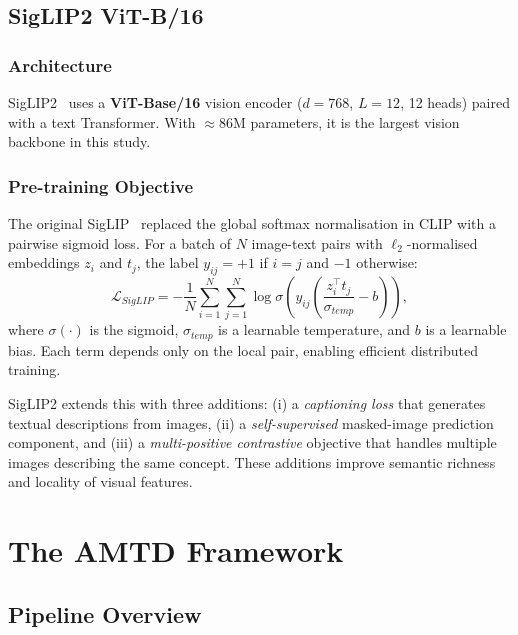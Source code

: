 \documentclass[journal]{IEEEtran}
\begin{document}
\subsection{SigLIP2 ViT-B/16}

\subsubsection{Architecture}

SigLIP2~\cite{tschannen2025siglip2} uses a \textbf{ViT-Base/16} vision encoder ($d=768$, $L=12$,
12 heads) paired with a text Transformer. With $\approx$86M parameters, it is the largest
vision backbone in this study.

\subsubsection{Pre-training Objective}

The original SigLIP~\cite{zhai2023siglip} replaced the global softmax normalisation in CLIP
with a pairwise sigmoid loss. For a batch of $N$ image-text pairs with $\ell_2$-normalised
embeddings $z_i$ and $t_j$, the label $y_{ij} = +1$ if $i=j$ and $-1$ otherwise:
\begin{equation}
    \mathcal{L}_{SigLIP} = -\frac{1}{N}\sum_{i=1}^{N}\sum_{j=1}^{N}
    \log \sigma\!\left(y_{ij}\!\left(\frac{z_i^\top t_j}{\sigma_{temp}} - b\right)\right),
    \label{eq:siglip_loss}
\end{equation}
where $\sigma(\cdot)$ is the sigmoid, $\sigma_{temp}$ is a learnable temperature, and $b$ is a
learnable bias. Each term depends only on the local pair, enabling efficient distributed training.

SigLIP2 extends this with three additions: (i) a \textit{captioning loss} that generates
textual descriptions from images, (ii) a \textit{self-supervised} masked-image prediction
component, and (iii) a \textit{multi-positive contrastive} objective that handles multiple
images describing the same concept. These additions improve semantic richness and locality
of visual features.

\section{The AMTD Framework}
\label{sec:amtd}

\subsection{Pipeline Overview}
\end{document}
